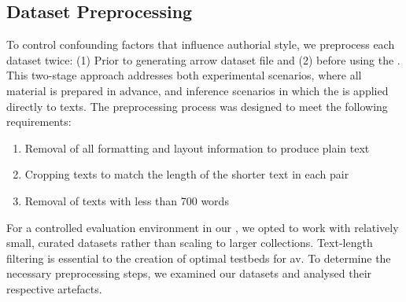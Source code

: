 
\subsection{Dataset Preprocessing}
\label{subsec:dataset_preprocessing}

To control confounding factors that influence authorial style, we preprocess each dataset twice:
(1) Prior to generating arrow dataset file and (2) before using the \impAppr{}.
This two-stage approach addresses both experimental scenarios, where all material is prepared in advance, and inference scenarios in which the \impAppr{} is applied directly to texts.
The preprocessing process was designed to meet the following requirements:
\begin{enumerate}
    \item Removal of all formatting and layout information to produce plain text
    \item Cropping texts to match the length of the shorter text in each pair
    \item Removal of texts with less than 700 words
\end{enumerate}
For a controlled evaluation environment in our \impAppr{}, we opted to work with relatively small, curated datasets rather than scaling to larger collections.  
Text-length filtering is essential to the creation of optimal testbeds for \ac{av}.
To determine the necessary preprocessing steps, we examined our datasets and analysed their respective artefacts.

